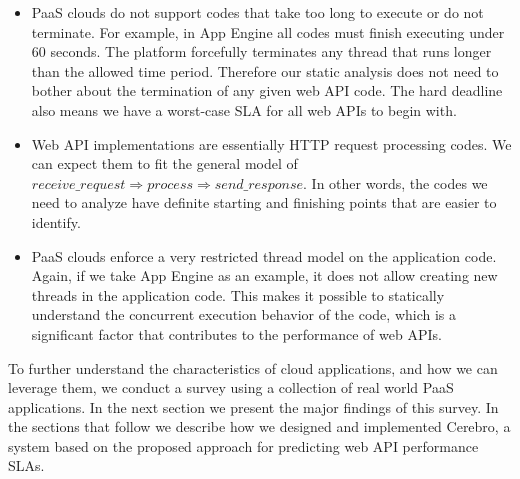 \begin{itemize}
\item PaaS clouds do not support codes that take too long to execute or do not terminate. For 
example, in App Engine all codes must finish executing under 60 seconds.
The platform forcefully terminates any thread that runs longer than the allowed time period.
Therefore our static analysis does not need to bother about the termination of any given web API
code. The hard deadline also means we have a worst-case SLA for all web APIs to begin with.
\item Web API implementations are essentially HTTP request processing codes. We can expect them
to fit the general model of $receive\_request \Rightarrow process \Rightarrow send\_response$. In
other words, the codes we need to analyze have definite starting and finishing points that are easier
to identify.
\item PaaS clouds enforce a very restricted thread model on the application code. Again, if we take
App Engine as an example, it does not allow creating new threads in the application code. This
makes it possible to statically understand the concurrent execution behavior of the code, which is a significant
factor that contributes to the performance of web APIs.
\end{itemize}

To further understand the characteristics of cloud applications, and how we can leverage them,
we conduct a survey
using a collection of real world PaaS applications. In the next section we present the major findings
of this survey.
In the sections that follow we describe how we designed and implemented Cerebro, a system based on
the proposed approach for predicting web API performance SLAs.